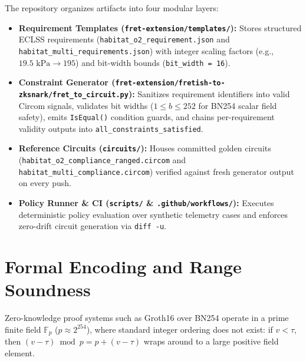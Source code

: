 \documentclass[runningheads]{llncs}
\begin{document}
The repository organizes artifacts into four modular layers:
\begin{itemize}
    \item \textbf{Requirement Templates (\texttt{fret-extension/templates/}):} Stores structured ECLSS requirements (\texttt{habitat\_o2\_requirement.json} and \texttt{habitat\_multi\_requirements.json}) with integer scaling factors (e.g., $19.5\text{ kPa} \rightarrow 195$) and bit-width bounds (\texttt{bit\_width = 16}).
    \item \textbf{Constraint Generator (\texttt{fret-extension/fretish-to-zksnark/fret\_to\_circuit.py}):} Sanitizes requirement identifiers into valid Circom signals, validates bit widths ($1 \le b \le 252$ for BN254 scalar field safety), emits \texttt{IsEqual()} condition guards, and chains per-requirement validity outputs into \texttt{all\_constraints\_satisfied}.
    \item \textbf{Reference Circuits (\texttt{circuits/}):} Houses committed golden circuits (\texttt{habitat\_o2\_compliance\_ranged.circom} and \texttt{habitat\_multi\_compliance.circom}) verified against fresh generator output on every push.
    \item \textbf{Policy Runner \& CI (\texttt{scripts/} \& \texttt{.github/workflows/}):} Executes deterministic policy evaluation over synthetic telemetry cases and enforces zero-drift circuit generation via \texttt{diff -u}.
\end{itemize}

\section{Formal Encoding and Range Soundness}
Zero-knowledge proof systems such as Groth16 over BN254 operate in a prime finite field $\mathbb{F}_p$ ($p \approx 2^{254}$), where standard integer ordering does not exist: if $v < \tau$, then $(v - \tau) \bmod p = p + (v - \tau)$ wraps around to a large positive field element.
\end{document}
